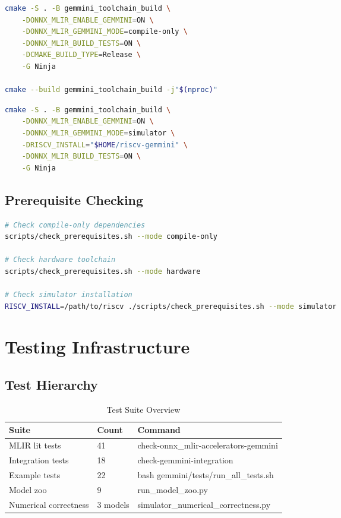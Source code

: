 \documentclass[12pt,a4paper]{article}
\begin{document}
\begin{lstlisting}[caption=Compile-Only Build, language=bash]
cmake -S . -B gemmini_toolchain_build \
    -DONNX_MLIR_ENABLE_GEMMINI=ON \
    -DONNX_MLIR_GEMMINI_MODE=compile-only \
    -DONNX_MLIR_BUILD_TESTS=ON \
    -DCMAKE_BUILD_TYPE=Release \
    -G Ninja

cmake --build gemmini_toolchain_build -j"$(nproc)"
\end{lstlisting}

\begin{lstlisting}[caption=Simulator Build, language=bash]
cmake -S . -B gemmini_toolchain_build \
    -DONNX_MLIR_ENABLE_GEMMINI=ON \
    -DONNX_MLIR_GEMMINI_MODE=simulator \
    -DRISCV_INSTALL="$HOME/riscv-gemmini" \
    -DONNX_MLIR_BUILD_TESTS=ON \
    -G Ninja
\end{lstlisting}

\subsection{Prerequisite Checking}

\begin{lstlisting}[caption=Prerequisite Check Examples, language=bash]
# Check compile-only dependencies
scripts/check_prerequisites.sh --mode compile-only

# Check hardware toolchain
scripts/check_prerequisites.sh --mode hardware

# Check simulator installation
RISCV_INSTALL=/path/to/riscv ./scripts/check_prerequisites.sh --mode simulator
\end{lstlisting}

\section{Testing Infrastructure}

\subsection{Test Hierarchy}

\begin{table}[H]
\centering
\begin{tabular}{|p{}|p{}|p{}|}
\hline
\textbf{Suite} & \textbf{Count} & \textbf{Command} \\
\hline
MLIR lit tests & 41 & check-onnx\_mlir-accelerators-gemmini \\
\hline
Integration tests & 18 & check-gemmini-integration \\
\hline
Example tests & 22 & bash gemmini/tests/run\_all\_tests.sh \\
\hline
Model zoo & 9 & run\_model\_zoo.py \\
\hline
Numerical correctness & 3 models & simulator\_numerical\_correctness.py \\
\hline
\end{tabular}
\caption{Test Suite Overview}
\end{table}
\end{document}
